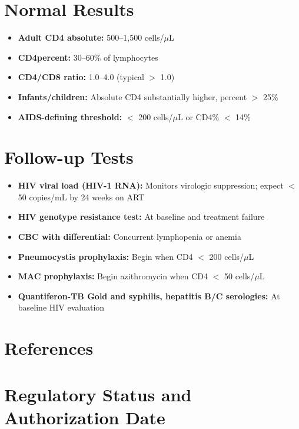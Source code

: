 \section*{Normal Results}
\begin{itemize}
  \item \textbf{Adult CD4 absolute:} 500--1,500 cells/$\mu$L
  \item \textbf{CD4percent:} 30--60\% of lymphocytes
  \item \textbf{CD4/CD8 ratio:} 1.0--4.0 (typical $>$ 1.0)
  \item \textbf{Infants/children:} Absolute CD4 substantially higher, percent $>$ 25\%
  \item \textbf{AIDS-defining threshold:} $<$ 200 cells/$\mu$L or CD4\% $<$ 14\%
\end{itemize}

\section*{Follow-up Tests}
\begin{itemize}
  \item \textbf{HIV viral load (HIV-1 RNA):} Monitors virologic suppression; expect $<$ 50 copies/mL by 24 weeks on ART
  \item \textbf{HIV genotype resistance test:} At baseline and treatment failure
  \item \textbf{CBC with differential:} Concurrent lymphopenia or anemia
  \item \textbf{Pneumocystis prophylaxis:} Begin when CD4 $<$ 200 cells/$\mu$L
  \item \textbf{MAC prophylaxis:} Begin azithromycin when CD4 $<$ 50 cells/$\mu$L
  \item \textbf{Quantiferon-TB Gold and syphilis, hepatitis B/C serologies:} At baseline HIV evaluation
\end{itemize}

\section*{References}



\clearpage
\section*{Regulatory Status and Authorization Date}

\clearpage
